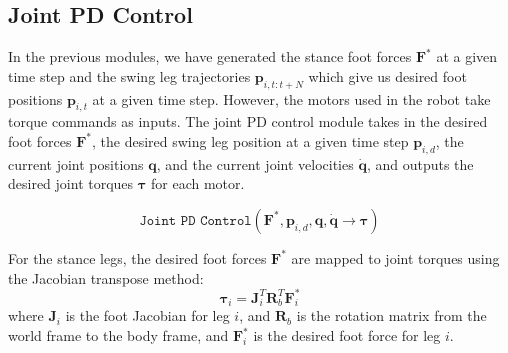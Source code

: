 \documentclass[12pt,a4paper]{article}
\theoremstyle{plain}
\theoremstyle{definition}
\theoremstyle{remark}
\begin{document}
\subsection{Joint PD Control}

In the previous modules, we have generated the stance foot forces $\mathbf{F}^*$ at a given time step and the swing leg trajectories $\mathbf{p}_{i, t:t+N}$ which give us desired foot positions $\mathbf{p}_{i,t}$ at a given time step. However, the motors used in the robot take torque commands as inputs. The joint PD control module takes in the desired foot forces $\mathbf{F}^*$, the desired swing leg position at a given time step $\mathbf{p}_{i,d}$, the current joint positions $\mathbf{q}$, and the current joint velocities $\dot{\mathbf{q}}$, and outputs the desired joint torques $\mathbf{\tau}$ for each motor.

\[\texttt{Joint PD Control}(\mathbf{F}^*, \mathbf{p}_{i,d}, \mathbf{q}, \dot{\mathbf{q}} \rightarrow \mathbf{\tau})\]

For the stance legs, the desired foot forces $\mathbf{F}^*$ are mapped to joint torques using the Jacobian transpose method:
\[
\mathbf{\tau}_i = \mathbf{J}_i^T\mathbf{R}_b^T\mathbf{F}^*_i
\]
where $\mathbf{J}_i$ is the foot Jacobian for leg $i$, and $\mathbf{R}_b$ is the rotation matrix from the world frame to the body frame, and $\mathbf{F}^*_i$ is the desired foot force for leg $i$.
\end{document}
